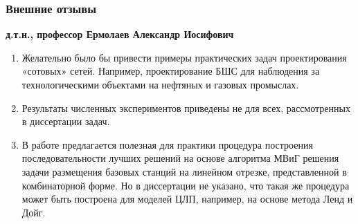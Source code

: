 \begin{frame}
    \frametitle{Внешние отзывы}
    \fontsize{8pt}{7.2}\selectfont
    \textbf{д.т.н., профессор Ермолаев Александр Иосифович}

    \bigskip

    \begin{enumerate}
        \item Желательно было бы привести примеры практических задач проектирования «сотовых» сетей. Например, проектирование БШС для наблюдения за технологическими объектами на нефтяных и газовых промыслах.
        \item Результаты численных экспериментов приведены не для всех, рассмотренных в диссертации задач.
        \item В работе предлагается полезная для практики процедура построения последовательности лучших решений на основе алгоритма МВиГ решения задачи размещения базовых станций на линейном отрезке, представленной в комбинаторной форме. Но в диссертации не указано, что такая же процедура может быть построена для моделей ЦЛП, например, на основе метода Ленд и Дойг.
        
        
    \end{enumerate}
\end{frame}